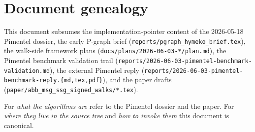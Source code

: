 \documentclass[11pt]{article}
\begin{document}
\section{Document genealogy}

This document subsumes the implementation-pointer content of
the 2026-05-18 Pimentel dossier, the early P-graph brief
(\texttt{reports/pgraph\_hymeko\_brief.tex}), the walk-side
framework plans (\texttt{docs/plans/2026-06-03-*/plan.md}), the
Pimentel benchmark validation trail
(\texttt{reports/2026-06-03-pimentel-benchmark-validation.md}), the
external Pimentel reply
(\texttt{reports/2026-06-03-pimentel-benchmark-reply.\{md,tex,pdf\}}),
and the paper drafts
(\texttt{paper/abb\_msg\_ssg\_signed\_walks/*.tex}).

For \emph{what the algorithms are} refer to the Pimentel dossier and
the paper. For \emph{where they live in the source tree} and
\emph{how to invoke them} this document is canonical.
\end{document}
